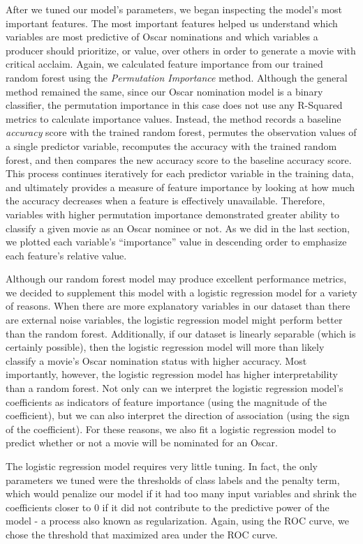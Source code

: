 \documentclass[10pt]{article}
\begin{document}
After we tuned our model’s parameters, we began inspecting the model’s most important features. The most important features helped us understand which variables are most predictive of Oscar nominations and which variables a producer should prioritize, or value, over others in order to generate a movie with critical acclaim. Again, we calculated feature importance from our trained random forest using the \textit{Permutation Importance} method. Although the general method remained the same, since our Oscar nomination model is a binary classifier, the permutation importance in this case does not use any R-Squared metrics to calculate importance values. Instead, the method records a baseline \textit{accuracy} score with the trained random forest, permutes the observation values of a single predictor variable, recomputes the accuracy with the trained random forest, and then compares the new accuracy score to the baseline accuracy score. This process continues iteratively for each predictor variable in the training data, and ultimately provides a measure of feature importance by looking at how much the accuracy decreases when a feature is effectively unavailable. Therefore, variables with higher permutation importance demonstrated greater ability to classify a given movie as an Oscar nominee or not. As we did in the last section, we plotted each variable’s “importance” value in descending order to emphasize each feature’s relative value. 

Although our random forest model may produce excellent performance metrics, we decided to supplement this model with a logistic regression model for a variety of reasons. When there are more explanatory variables in our dataset than there are external noise variables, the logistic regression model might perform better than the random forest. Additionally, if our dataset is linearly separable (which is certainly possible), then the logistic regression model will more than likely classify a movie’s Oscar nomination status with higher accuracy. Most importantly, however, the logistic regression model has higher interpretability than a random forest. Not only can we interpret the logistic regression model’s coefficients as indicators of feature importance (using the magnitude of the coefficient), but we can also interpret the direction of association (using the sign of the coefficient). For these reasons, we also fit a logistic regression model to predict whether or not a movie will be nominated for an Oscar. 

The logistic regression model requires very little tuning. In fact, the only parameters we tuned were the thresholds of class labels and the penalty term, which would penalize our model if it had too many input variables and shrink the coefficients closer to 0 if it did not contribute to the predictive power of the model - a process also known as regularization. Again, using the ROC curve, we chose the threshold that maximized area under the ROC curve. 
\end{document}
